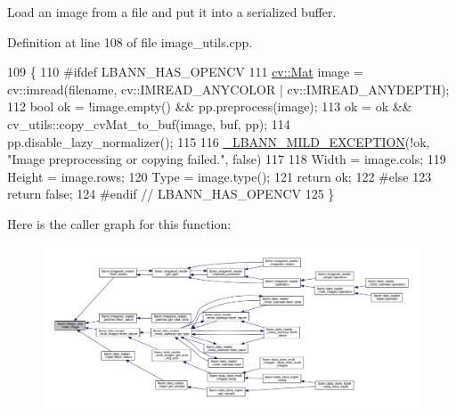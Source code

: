Load an image from a file and put it into a serialized buffer. 



Definition at line 108 of file image\+\_\+utils.\+cpp.


\begin{DoxyCode}
109                                                                                                            
            \{
110 \textcolor{preprocessor}{#ifdef LBANN\_HAS\_OPENCV}
111   \hyperlink{base_8hpp_a68f11fdc31b62516cb310831bbe54d73}{cv::Mat} image = cv::imread(filename, cv::IMREAD\_ANYCOLOR | cv::IMREAD\_ANYDEPTH);
112   \textcolor{keywordtype}{bool} ok = !image.empty() && pp.preprocess(image);
113   ok = ok && cv\_utils::copy\_cvMat\_to\_buf(image, buf, pp);
114   pp.disable\_lazy\_normalizer();
115 
116   \hyperlink{mild__exception_8hpp_a7b8339c566152ab29ce66b63e90c67f9}{\_LBANN\_MILD\_EXCEPTION}(!ok, \textcolor{stringliteral}{"Image preprocessing or copying failed."}, \textcolor{keyword}{false})
117 
118   Width  = image.cols;
119   Height = image.rows;
120   Type   = image.type();
121   return ok;
122 \textcolor{preprocessor}{#else}
123   \textcolor{keywordflow}{return} \textcolor{keyword}{false};
124 \textcolor{preprocessor}{#endif // LBANN\_HAS\_OPENCV}
125 \}
\end{DoxyCode}
Here is the caller graph for this function\+:\nopagebreak
\begin{figure}[H]
\begin{center}
\leavevmode
\includegraphics[width=350pt]{classlbann_1_1image__utils_ac324a04f877601387cfb10750f1f6b8d_icgraph}
\end{center}
\end{figure}
\mbox{\label{classlbann_1_1image__utils_ae7270652ab69d7b659c2a9ae5a7057ab}} 
